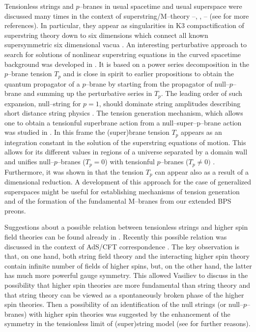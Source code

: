 \documentclass[a4paper,11pt]{article}
\begin{document}
Tensionless strings and $p$--branes in usual spacetime 
and usual superspace  
were discussed many times in the context of superstring/M--theory 
\cite{Shild}--\cite{Zh}, \cite{BZ}, \cite{Lindstrom2}--\cite{CEGK}
(see \cite{BZ,Bozhilov1} for more references). In particular, 
they appear as singularities in K3 compactification of superstring theory 
down  to six dimensions which connect all known supersymmetric six 
dimensional vacua \cite{Witten}. 
An interesting perturbative approach to  search for solutions  
of nonlinear superstring equations in the curved spacetime background 
was developed in \cite{Zh}. It is based on a power series decomposition 
in the $p$--brane tension  $T_p$ and 
is close in spirit to earlier propositions \cite{Isham} 
to obtain the quantum propagator of a $p$--brane by starting from the 
propagator 
of null--$p$--brane and summing up the perturbative series in $T_p$. 
The leading order of such expansion, null--string for $p=1$, 
should dominate string amplitudes describing short distance string  physics 
\cite{Gross}.  
The tension generation mechanism, which allows one to obtain 
a tensionful superbrane action from a null--super--p--brane action 
was studied in \cite{ten-gen,ten-gen1}. In this frame 
the (super)brane tension $T_p$ appears as an integration 
constant in the solution of the superstring equations of motion. 
This allows for its different values in  regions of a  
universe separated by a domain wall and unifies null--$p$--branes 
($T_p=0$) with tensionful $p$--branes ($T_p\not= 0)$ . 
Furthermore, it was shown in \cite{ten-gen1} that the tension 
$T_p$ can appear also as a result of a dimensional reduction. 
A development of this approach for the case of generalized superspaces 
might be useful for establishing mechanisms of tension generation and 
of the formation of the fundamental M--branes from our extended BPS preons. 


Suggestions about a possible relation between tensionless strings and 
higher spin field theories can be found already in 
\cite{Vasiliev89}. Recently this possible relation was discussed 
in the context of AdS/CFT correspondence \cite{Sundborg}. The key 
observation is that, on one hand, both string field theory 
and the interacting higher spin theory contain infinite number 
of fields of higher spins, but, on the other hand,  
the latter has much more powerful gauge symmetry. This allowed Vasiliev to 
discuss in \cite{Vasiliev89} the possibility  
that higher spin theories are more 
fundamental than string theory and that  string theory can be viewed 
as a spontaneously broken phase of the higher spin theories. 
Then a possibility of an identification of 
the null strings (or null--$p$--branes) 
with higher spin theories was suggested by the enhancement of the symmetry 
in the tensionless limit of (super)string model 
(see \cite{Sundborg} for further reasons). 
\end{document}
